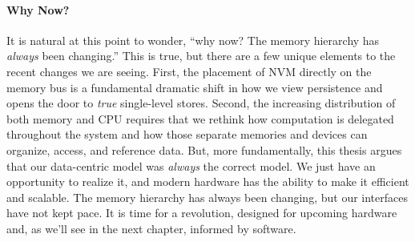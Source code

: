 



\paragraph{Why Now?}



It is natural at this point to wonder, ``why now? The memory hierarchy has \emph{always} been changing.'' This is true,
but there are a few unique elements to the recent changes we are seeing. First, the placement of NVM directly on the
memory bus is a fundamental dramatic shift in how we view persistence and opens the door to \emph{true} single-level
stores. Second, the increasing distribution of both memory and CPU requires that we rethink how computation is delegated
throughout the system and how those separate memories and devices can organize, access, and reference data.
But, more fundamentally, this thesis argues that our data-centric model was \emph{always} the correct model. We just
have an opportunity to realize it, and modern hardware has the ability to make it efficient and scalable. The memory
hierarchy has always been changing, but our interfaces have not kept pace. It is time for a revolution, designed for
upcoming hardware and, as we'll see in the next chapter, informed by software.

